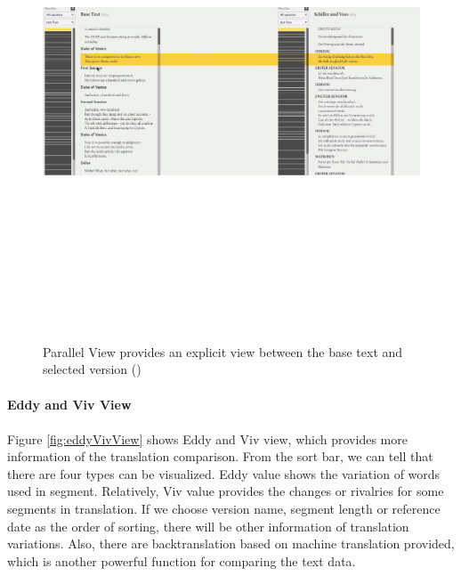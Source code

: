 \begin{figure}[H] 
	\centering	
	\includegraphics[width=16cm, height=14cm]{Figs/Parallel-View}\\[1ex]
	\caption{Parallel View provides an explicit view between the base text and selected version (\cite{Cheesman2012})}
	\label{fig:parallelView}
\end{figure} 

\paragraph{Eddy and Viv View}
\paragraph[]{}

Figure \ref{fig:eddyVivView} shows Eddy and Viv view, which provides more information of the translation comparison. From the sort bar, we can tell that there are four types can be visualized. Eddy value shows the variation of words used in segment. Relatively, Viv value provides the changes or rivalries for some segments in translation. If we choose version name, segment length or reference date as the order of sorting, there will be other information of translation variations. Also, there are backtranslation based on machine translation provided, which is another powerful function for comparing the text data.

